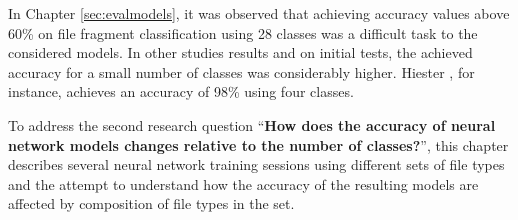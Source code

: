 In Chapter \ref{sec:evalmodels}, it was observed that achieving accuracy values above 60\% on file fragment classification using 28 classes was a difficult task to the considered models. In other studies results \cite{hiester_file_2018} \cite{sportiello_context-based_2012} \cite{amirani_feature-based_2013} \cite{maslim_distributed_2014} and on initial tests, the achieved accuracy for a small number of classes was considerably higher. Hiester \cite{hiester_file_2018}, for instance, achieves an accuracy of 98\% using four classes.

To address the second research question 
``\textbf{How does the accuracy of neural network models changes relative to the number of classes?}'', 
this chapter describes several neural network training sessions using different sets of file types and the attempt to understand how the accuracy of the resulting models are affected by composition of file types in the set.
